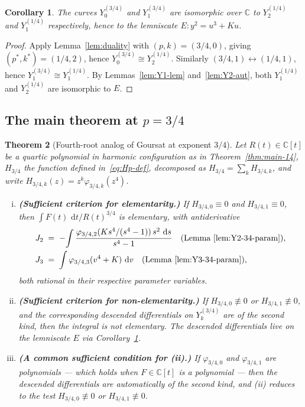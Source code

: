 \documentclass[11pt,a4paper]{article}
\theoremstyle{plain}
\newtheorem{theorem}{Theorem}[section]
\newtheorem{corollary}[theorem]{Corollary}
\theoremstyle{definition}
\theoremstyle{remark}
\newcommand{\C}{\mathbb{C}}
\renewcommand{\d}{\,\mathrm{d}}
\begin{document}
\begin{corollary}\label{cor:lemniscate-34}
The curves $Y_0^{(3/4)}$ and $Y_1^{(3/4)}$ are isomorphic over $\C$ to $Y_2^{(1/4)}$ and $Y_1^{(1/4)}$ respectively, hence to the lemniscate $E\colon y^2 = u^3 + Ku$.
\end{corollary}

\begin{proof}
Apply Lemma~\ref{lem:duality} with $(p, k) = (3/4, 0)$, giving $(p^*, k^*) = (1/4, 2)$, hence $Y_0^{(3/4)} \cong Y_2^{(1/4)}$. Similarly $(3/4, 1) \leftrightarrow (1/4, 1)$, hence $Y_1^{(3/4)} \cong Y_1^{(1/4)}$. By Lemmas~\ref{lem:Y1-lem} and~\ref{lem:Y2-aut}, both $Y_1^{(1/4)}$ and $Y_2^{(1/4)}$ are isomorphic to $E$.
\end{proof}

\subsection*{The main theorem at $p = 3/4$}

\begin{theorem}[Fourth-root analog of Goursat at exponent $3/4$]\label{thm:main-34}
Let $R(t) \in \C[t]$ be a quartic polynomial in harmonic configuration as in Theorem~\ref{thm:main-14}, $H_{3/4}$ the function defined in~\eqref{eq:Hp-def}, decomposed as $H_{3/4} = \sum_k H_{3/4,k}$, and write $H_{3/4,k}(z) = z^k\varphi_{3/4,k}(z^4)$.
\begin{enumerate}[(i)]
  \item \textbf{(Sufficient criterion for elementarity.)} If $H_{3/4, 0} \equiv 0$ and $H_{3/4, 1} \equiv 0$, then $\int F(t)\,\d t / R(t)^{3/4}$ is elementary, with antiderivative
  \begin{align*}
    J_2 \;&=\; -\!\int \frac{\varphi_{3/4, 2}(K s^4/(s^4-1))\,s^2\,\d s}{s^4 - 1} \quad\text{(Lemma~\ref{lem:Y2-34-param})}, \\
    J_3 \;&=\; \int \varphi_{3/4, 3}(v^4 + K)\,\d v \quad\text{(Lemma~\ref{lem:Y3-34-param})},
  \end{align*}
  both rational in their respective parameter variables.
  \item \textbf{(Sufficient criterion for non-elementarity.)} If $H_{3/4, 0} \not\equiv 0$ or $H_{3/4, 1} \not\equiv 0$, and the corresponding descended differentials on $Y_k^{(3/4)}$ are of the second kind, then the integral is not elementary. The descended differentials live on the lemniscate $E$ via Corollary~\ref{cor:lemniscate-34}.
  \item \textbf{(A common sufficient condition for (ii).)} If $\varphi_{3/4,0}$ and $\varphi_{3/4,1}$ are polynomials --- which holds when $F\in\C[t]$ is a polynomial --- then the descended differentials are automatically of the second kind, and (ii) reduces to the test $H_{3/4,0}\not\equiv 0$ or $H_{3/4,1}\not\equiv 0$.
\end{enumerate}
\end{theorem}
\end{document}
